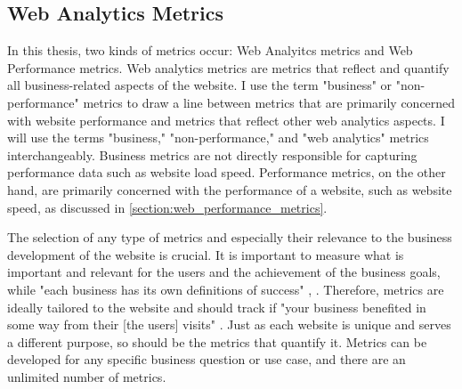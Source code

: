 


\subsection{Web Analytics Metrics} %
\label{subsection:web_analytics_metrics}






In this thesis, two kinds of metrics occur: Web Analyitcs metrics and Web Performance metrics.
Web analytics metrics are metrics that reflect and quantify all business-related aspects of the website.
I use the term "business" or "non-performance" metrics to draw a line between metrics that are primarily concerned with website performance and metrics that reflect other web analytics aspects.
I will use the terms "business," "non-performance," and "web analytics" metrics interchangeably.
Business metrics are not directly responsible for capturing performance data such as website load speed.
Performance metrics, on the other hand, are primarily concerned with the performance of a website, such as website speed, as discussed in \ref{section:web_performance_metrics}.


The selection of any type of metrics and especially their relevance to the business development of the website is crucial.
It is important to measure what is important and relevant for the users and the achievement of the business goals, while "each business has its own definitions of success" \cite[p. 7]{2009Croll}, \cite{2021MDNMeasuringPerformance}.
Therefore, metrics are ideally tailored to the website and should track if "your business benefited in some way from their [the users] visits" \cite[p. 15]{2009Croll}.
Just as each website is unique and serves a different purpose, so should be the metrics that quantify it.
Metrics can be developed for any specific business question or use case, and there are an unlimited number of metrics.

